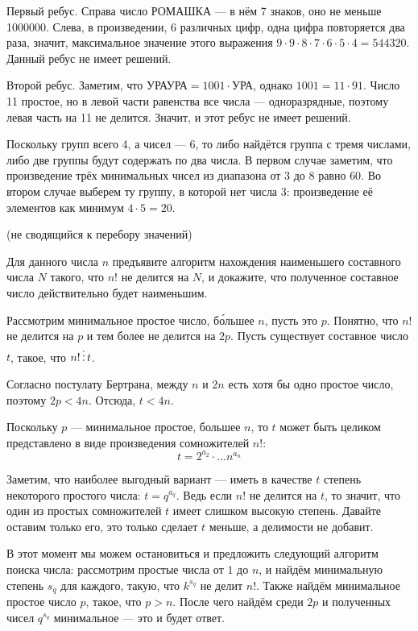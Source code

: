\begin{itemize}
\itA Первый ребус. Справа число РОМАШКА --- в нём 7 знаков, оно не меньше 1000000.
Слева, в произведении, 6 различных цифр, одна цифра повторяется два раза, значит, максимальное
значение этого выражения $9\cdot 9 \cdot 8 \cdot 7 \cdot 6 \cdot 5 \cdot 4 = 544320$.
Данный ребус не имеет решений.

Второй ребус. Заметим, что $\text{УРАУРА} = 1001 \cdot \text{УРА}$, однако $1001 = 11 \cdot 91$.
Число 11 простое, но в левой части равенства все числа --- одноразрядные, поэтому левая часть
на 11 не делится. Значит, и этот ребус не имеет решений.

\itB Поскольку групп всего 4, а чисел --- 6, то либо найдётся группа с тремя числами, либо две
группы будут содержать по два числа. В первом случае заметим, что произведение трёх минимальных
чисел из диапазона от 3 до 8 равно $60$. Во втором случае выберем ту группу, в которой нет 
числа 3: произведение её элементов как минимум $4 \cdot 5 = 20$.

\itC (не сводящийся к перебору значений)

Для данного числа $n$ предъявите алгоритм нахождения наименьшего составного числа $N$ 
такого, что $n!$ не делится на $N$, и докажите, что полученное составное число действительно
будет наименьшим.

Рассмотрим минимальное простое число, б\'ольшее $n$, пусть это $p$.
Понятно, что $n!$ не делится на $p$ и тем более не делится на $2p$. 
Пусть существует составное число $t$, такое, что $n! \mathop{\vdots} t$.

Согласно постулату Бертрана, между $n$ и $2n$ есть хотя бы одно простое число,
поэтому $2p < 4n$. Отсюда, $t < 4n$. 

Поскольку $p$ --- минимальное простое, большее $n$, то $t$ может быть целиком
представлено в виде произведения сомножителей $n!$: 
$$t = 2^{a_2} \cdot \ldots n^{a_n}$$

Заметим, что наиболее выгодный вариант --- иметь в качестве $t$ степень некоторого
простого числа: $t = q^{a_q}$. Ведь если $n!$ не делится на $t$, то значит, что один
из простых сомножителей $t$ имеет слишком высокую степень. Давайте оставим только его,
это только сделает $t$ меньше, а делимости не добавит.

В этот момент мы можем остановиться и предложить следующий алгоритм поиска 
числа: рассмотрим простые числа от $1$ до $n$, и найдём минимальную степень 
$s_q$ для каждого, такую, что $k^{s_q}$ не делит $n!$. Также найдём минимальное
простое число $p$, такое, что $p > n$. После чего найдём среди $2p$ и полученных
чисел $q^{s_q}$ минимальное --- это и будет ответ.


\end{itemize}
